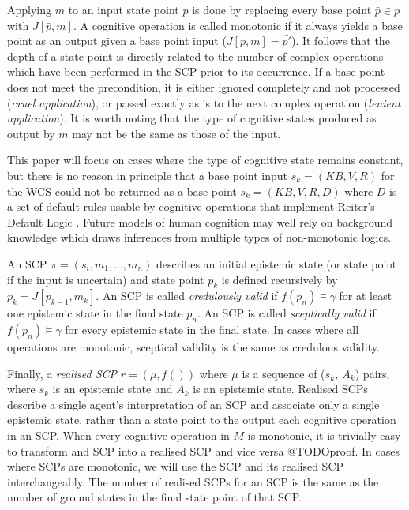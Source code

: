 Applying $m$ to an input state point $p$ is done by replacing every base point $\bar{p} \in p$ with $J[\bar{p},m]$. A cognitive operation is called monotonic if it always yields a base point as an output given a base point input ($J[\bar{p},m]=\bar{p'}$). It follows that the depth of a state point is directly related to the number of complex operations which have been performed in the SCP prior to its occurrence. If a base point does not meet the precondition, it is either ignored completely and not processed (\textit{cruel application}), or passed exactly as is to the next complex operation (\textit{lenient application}). It is worth noting that the type of cognitive states produced as output by $m$ may not be the same as those of the input.

This paper will focus on cases where the type of cognitive state remains constant, but there is no reason in principle that a base point input $s_k = (KB,V,R)$ for the WCS could not be returned as a base point $s_k = (KB,V,R,D)$ where $D$ is a set of default rules usable by cognitive operations that implement Reiter's Default Logic \citep{reiter1980logic}. Future models of human cognition may well rely on background knowledge which draws inferences from multiple types of non-monotonic logics.

An SCP $\pi=(s_i,m_1,...,m_n)$ describes an initial epistemic state (or state point if the input is uncertain) and state point $p_k$ is defined recursively by $p_k = J[p_{k-1},m_k]$. An SCP is called \textit{credulously valid} if $f(p_n) \models \gamma$ for at least one epistemic state in the final state $p_n$. An SCP is called \textit{sceptically valid} if $f(p_n) \models \gamma$ for every epistemic state in the final state. In cases where all operations are monotonic, sceptical validity is the same as credulous validity.

Finally, a \textit{realised SCP} $r = (\mu, f())$ where $\mu$ is a sequence of (\textit{$s_k$, $A_k$}) pairs, where $s_k$ is an epistemic state and $A_k$ is an epistemic state. Realised SCPs describe a single agent's interpretation of an SCP and associate only a single epistemic state, rather than a state point to the output each cognitive operation in an SCP. When every cognitive operation in $M$ is monotonic, it is trivially easy to transform and SCP into a realised SCP and vice versa @TODOproof. In cases where SCPs are monotonic, we will use the SCP and its realised SCP interchangeably. The number of realised SCPs for an SCP is the same as the number of ground states in the final state point of that SCP.



